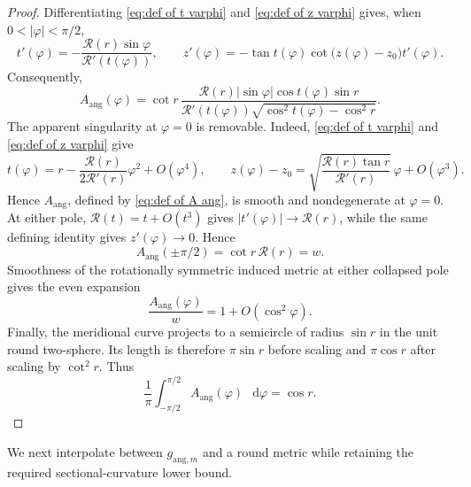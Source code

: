 \documentclass[11pt,reqno]{amsart}
\theoremstyle{definition}
\numberwithin{equation}{section}
\newcommand{\dd}{\mathop{}\!\mathrm d}
\begin{document}
\begin{proof}
 Differentiating \eqref{eq:def of t varphi} and
 \eqref{eq:def of z varphi} gives, when
 $0<|\varphi|<\pi/2$,
 \[
  t'(\varphi)
    =-\frac{\mathcal R(r)\sin\varphi}
            {\mathcal R'(t(\varphi))},
  \qquad
  z'(\varphi)
    =-\tan t(\varphi)\cot\bigl(z(\varphi)-z_0\bigr)t'(\varphi).
 \]
 Consequently,
 \[
  A_{\mathrm{ang}}(\varphi)
   =\cot r\,
     \frac{\mathcal R(r)|\sin\varphi|\cos t(\varphi)\sin r}
     {\mathcal R'(t(\varphi))
      \sqrt{\cos^2t(\varphi)-\cos^2r}}.
 \]
 The apparent singularity at $\varphi=0$ is removable.  Indeed, \eqref{eq:def of t varphi} and \eqref{eq:def of z varphi} give
 \[
  t(\varphi)
   =r-\frac{\mathcal R(r)}{2\mathcal R'(r)}\varphi^2+O(\varphi^4),
  \qquad
  z(\varphi)-z_0
   =\sqrt{\frac{\mathcal R(r)\tan r}{\mathcal R'(r)}}\,\varphi
      +O(\varphi^3).
 \]
 Hence $A_{\mathrm{ang}}$, defined by \eqref{eq:def of A ang}, is
 smooth and nondegenerate at $\varphi=0$.  At either pole,
 $\mathcal R(t)=t+O(t^3)$ gives
 $|t'(\varphi)|\longrightarrow\mathcal R(r)$, while the same defining
 identity gives $z'(\varphi)\longrightarrow0$.  Hence
 \[
  A_{\mathrm{ang}}(\pm\pi/2)=\cot r\,\mathcal R(r)=w.
 \]
 Smoothness of the rotationally symmetric induced metric at either
 collapsed pole gives the even expansion
 \[
   \frac{A_{\mathrm{ang}}(\varphi)}w
        =1+O(\cos^2\varphi).
 \]
 Finally, the meridional curve projects to a semicircle of radius
 $\sin r$ in the unit round two-sphere.  Its length is therefore
 $\pi\sin r$ before scaling and $\pi\cos r$ after scaling by
 $\cot^2r$.  Thus
\begin{equation}
\frac1\pi\int_{-\pi/2}^{\pi/2}A_{\mathrm{ang}}(\varphi)\,\dd\varphi=\cos r.    \label{eq:unified-base-3-26}
\end{equation}
\end{proof}
We next interpolate between $g_{\mathrm{ang},m}$ and a round metric
while retaining the required sectional-curvature lower bound.
\end{document}
